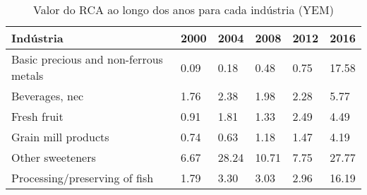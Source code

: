 \begin{table}
\centering
\caption{Valor do RCA ao longo dos anos para cada indústria (YEM)}
\label{tab:ex3-tempo-YEM}
\begin{tabular}{p{6cm}p{1.5cm}p{1.5cm}p{1.5cm}p{1.5cm}p{1.5cm}}
\toprule
                            Indústria & 2000 &  2004 &  2008 & 2012 &  2016 \\
\midrule
Basic precious and non-ferrous metals & 0.09 &  0.18 &  0.48 & 0.75 & 17.58 \\
                       Beverages, nec & 1.76 &  2.38 &  1.98 & 2.28 &  5.77 \\
                          Fresh fruit & 0.91 &  1.81 &  1.33 & 2.49 &  4.49 \\
                  Grain mill products & 0.74 &  0.63 &  1.18 & 1.47 &  4.19 \\
                     Other sweeteners & 6.67 & 28.24 & 10.71 & 7.75 & 27.77 \\
        Processing/preserving of fish & 1.79 &  3.30 &  3.03 & 2.96 & 16.19 \\
\bottomrule
\end{tabular}
\end{table}
